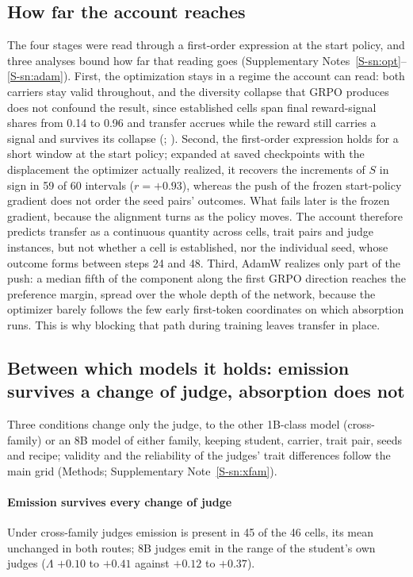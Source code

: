 
\subsection{How far the account reaches}

The four stages were read through a first-order expression at the start policy, and three analyses bound how far that reading goes (Supplementary Notes~\ref{S-sn:opt}--\ref{S-sn:adam}). First, the optimization stays in a regime the account can read: both carriers stay valid throughout, and the diversity collapse that GRPO produces does not confound the result, since established cells span final reward-signal shares from 0.14 to 0.96 and transfer accrues while the reward still carries a signal and survives its collapse (\edfig{\ref{fig:dynamics}}; \edtab{\ref{tab:ed-time}}). Second, the first-order expression holds for a short window at the start policy; expanded at saved checkpoints with the displacement the optimizer actually realized, it recovers the increments of $S$ in sign in 59 of 60 intervals ($r = +0.93$), whereas the push of the frozen start-policy gradient does not order the seed pairs' outcomes. What fails later is the frozen gradient, because the alignment turns as the policy moves. The account therefore predicts transfer as a continuous quantity across cells, trait pairs and judge instances, but not whether a cell is established, nor the individual seed, whose outcome forms between steps 24 and 48. Third, AdamW realizes only part of the push: a median fifth of the component along the first GRPO direction reaches the preference margin, spread over the whole depth of the network, because the optimizer barely follows the few early first-token coordinates on which absorption runs. This is why blocking that path during training leaves transfer in place.

\subsection{Between which models it holds: emission survives a change of judge, absorption does not}

Three conditions change only the judge, to the other 1B-class model (cross-family) or an 8B model of either family, keeping student, carrier, trait pair, seeds and recipe; validity and the reliability of the judges' trait differences follow the main grid (Methods; Supplementary Note~\ref{S-sn:xfam}).

\paragraph{Emission survives every change of judge} Under cross-family judges emission is present in 45 of the 46 cells, its mean unchanged in both routes; 8B judges emit in the range of the student's own judges ($\Lambda$ $+0.10$ to $+0.41$ against $+0.12$ to $+0.37$).

